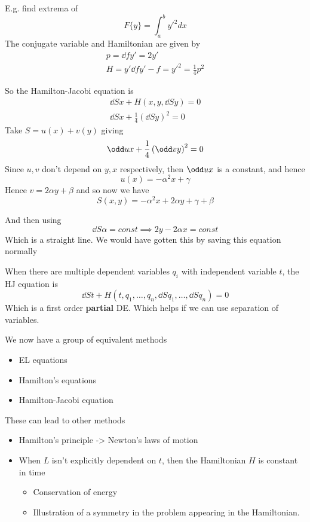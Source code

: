 \documentclass{E:/Documents/Latex/myassignment}
\begin{document}
E.g. find extrema of
\[F\{y\} = \int_a^b y'^2 dx\]
The conjugate variable and Hamiltonian are given by
\begin{align*}
	 p = \dd f{y'} = 2y'\\
	 H = y' \dd f{y'} - f = y'^2 = \frac14 p^2
\end{align*}

So the Hamilton-Jacobi equation is
\begin{align*}
	\dd Sx + H\left(x,y,\dd Sy\right) = 0\\
	\dd Sx + \frac14 \left(\dd Sy\right)^2 = 0
\end{align*}
Take $S = u(x) + v(y)$ giving
\[\odd ux + \frac14 \left(\odd vy\right)^2 = 0\]
Since $u,v$ don't depend on $y,x$ respectively, then $\odd ux$ is a constant, and hence
\[u(x) = -\alpha^2 x + \gamma\]
Hence $v = 2 \alpha y + \beta$ and so now we have
\[S(x,y) = -\alpha^2 x + 2 \alpha y + \gamma + \beta\]

And then using
\[\dd S \alpha = const \implies 2 y - 2 \alpha x = const\]
Which is a straight line.
We would have gotten this by saving this equation normally




When there are multiple dependent variables $q_i$ with independent variable $t$, the HJ equation is
\[\dd St + H \left(t,q_1,\ldots,q_n, \dd S{q_1},\ldots, \dd S{q_n}\right) = 0\]
Which is a first order \textbf{partial} DE. Which helps if we can use separation of variables.




We now have a group of equivalent methods
\begin{itemize}
	\item EL equations
	\item Hamilton's equations
	\item Hamilton-Jacobi equation
\end{itemize}
These can lead to other methods
\begin{itemize}
	\item Hamilton's principle -> Newton's laws of motion
	\item When $L$ isn't explicitly dependent on $t$, then the Hamiltonian $H$ is constant in time
	\begin{itemize}
		\item Conservation of energy
		\item Illustration of a symmetry in the problem appearing in the Hamiltonian.
	\end{itemize}
\end{itemize}
\end{document}
